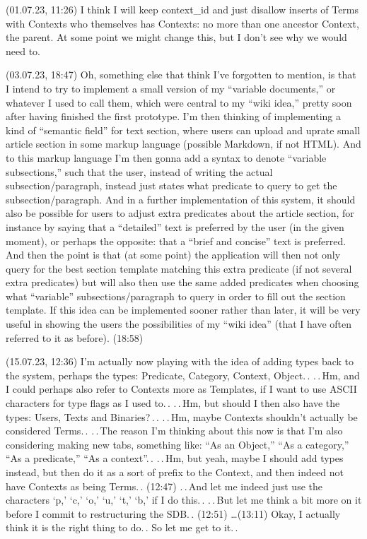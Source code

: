 \documentclass{report}
\begin{document}
(01.07.23, 11:26) I think I will keep context\_id and just disallow inserts of Terms with Contexts who themselves has Contexts: no more than one ancestor Context, the parent. At some point we might change this, but I don't see why we would need to.

(03.07.23, 18:47) Oh, something else that  think I've forgotten to mention, is that I intend to try to implement a small version of my ``variable documents,'' or whatever I used to call them, which were central to my ``wiki idea,'' pretty soon after having finished the first prototype. I'm then thinking of implementing a kind of ``semantic field'' for text section, where users can upload and uprate small article section in some markup language (possible Markdown, if not HTML). And to this markup language I'm then gonna add a syntax to denote ``variable subsections,'' such that the user, instead of writing the actual subsection/paragraph, instead just states what predicate to query to get the subsection/paragraph. And in a further implementation of this system, it should also be possible for users to adjust extra predicates about the article section, for instance by saying that a ``detailed'' text is preferred by the user (in the given moment), or perhaps the opposite: that a ``brief and concise'' text is preferred. And then the point is that (at some point) the application will then not only query for the best section template matching this extra predicate (if not several extra predicates) but will also then use the same added predicates when choosing what ``variable'' subsections/paragraph to query in order to fill out the section template. If this idea can be implemented sooner rather than later, it will be very useful in showing the users the possibilities of my ``wiki idea'' (that I have often referred to it as before). (18:58)


(15.07.23, 12:36) I'm actually now playing with the idea of adding types back to the system, perhaps the types: Predicate, Category, Context, Object.\,. .\,.\,Hm, and I could perhaps also refer to Contexts more as Templates, if I want to use ASCII characters for type flags as I used to.\,. .\,.\,Hm, but should I then also have the types: Users, Texts and Binaries?\,.\,. .\,.\,Hm, maybe Contexts shouldn't actually be considered Terms.\,. .\,.\,The reason I'm thinking about this now is that I'm also considering making new tabs, something like: ``As an Object,'' ``As a category,'' ``As a predicate,'' ``As a context''.\,. .\,.\,Hm, but yeah, maybe I should add types instead, but then do it as a sort of prefix to the Context, and then indeed not have Contexts as being Terms.\,. (12:47) .\,.\,And let me indeed just use the characters `p,' `c,' `o,' `u,' `t,' `b,' if I do this.\,. .\,.\,But let me think a bit more on it before I commit to restructuring the SDB.\,. (12:51) \ldots (13:11) Okay, I actually think it is the right thing to do.\,. So let me get to it.\,.
\end{document}
